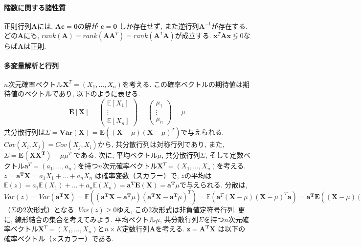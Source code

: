 \documentclass[paper=a4paper,fontsize=10pt]{jlreq}
\begin{document}
\paragraph{階数に関する諸性質}
正則行列$\mathbf{A}$には, $\mathbf{A}\mathbf{c}=\mathbf{0}$の解が $\mathbf{c}=\mathbf{0}$ しか存在せず, また逆行列$\mathbf{A}^{-1}$が存在する. どの$\mathbf{A}$にも, $rank(\mathbf{A})=rank(\mathbf{A}\mathbf{A}^T)=rank(\mathbf{A}^T\mathbf{A})$が成立する. $\mathbf{x}^T\mathbf{A}\mathbf{x}\lessgtr0$ならば$\mathbf{A}$は正則.\\

\paragraph{多変量解析と行列}
$n$次元確率ベクトル$\mathbf{X}^T=(X_1,\dots,X_n)$を考える. この確率ベクトルの期待値は期待値のベクトルであり, 以下のように表せる.
\begin{equation*}
  \mathbf{E[X]} = \begin{pmatrix} \mathbf{\mathbb{E}}[X_1] \\ \vdots \\ \mathbf{\mathbb{E}}[X_n] \end{pmatrix} = \begin{pmatrix} \mu_1 \\ \vdots \\ \mu_n \end{pmatrix} = \mu
\end{equation*}
共分散行列は$\Sigma=\mathbf{Var(X)}=\mathbf{E}((\mathbf{X}-\mu)(\mathbf{X}-\mu)^T)$で与えられる. $Cov(X_i, X_j)=Cov(X_j, X_i)$から, 共分散行列は対称行列であり, また, $\Sigma=\mathbf{E(XX^T)}-{\mu\mu^T}$ である. 次に, 平均ベクトル$\mu$, 共分散行列$\Sigma$, そして定数ベクトル$\mathbf{a}^T=(a_1,\dots,a_n)$を持つ$n$次元確率ベクトル$\mathbf{X}^T=(X_1,\dots,X_n)$を考える. $z=\mathbf{a^T X}=a_1X_1+\dots+a_nX_n$ は確率変数（スカラー）で,  $z$の平均は$\mathbb{E}(z)=a_1\mathbb{E}(X_1)+\dots+a_n\mathbb{E}(X_n)=\mathbf{a^T E(X)}=\mathbf{a^T}\mu$で与えられる. 分散は, $Var(z)=Var(\mathbf{a^T X})=\mathbb{E}((\mathbf{a^T X-a^T} \mu)(\mathbf{a^T X-a^T} \mu)^T)=\mathbb{E}(\mathbf{a}^T (\mathbf{X}-\mu)(\mathbf{X}-\mu)^T \mathbf{a})=\mathbf{a^T}\mathbf{E}({(\mathbf{X}-\mu)(\mathbf{X}-\mu)^T })\mathbf{a}=\mathbf{a^T}\mathbf{Var(X)}\mathbf{a}=\mathbf{a^T} \Sigma \mathbf{a}$（$\Sigma$の2次形式）となる. $Var(z)\geq 0$ゆえ, この2次形式は非負値定符号行列. 更に, 線形結合の集合を考えてみよう. 平均ベクトル$\mu$, 共分散行列$\Sigma$を持つ$n$次元確率ベクトル$\mathbf{X}^T=(X_1,\dots,X_n)$と$n\times K$定数行列$\mathbf{A}$を考える. $\mathbf{z}=\mathbf{A^T X}$ は以下の確率ベクトル（×スカラー）である.
\end{document}
